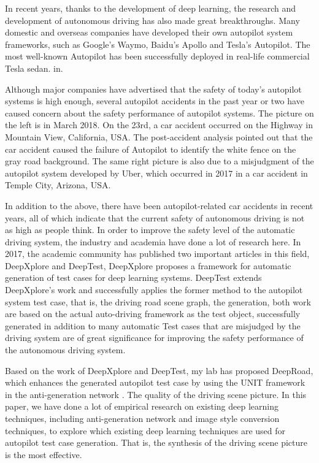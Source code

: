\begin{eabstract}
  In recent years, thanks to the development of deep learning, the research and development of autonomous driving has also made great breakthroughs. Many domestic and overseas companies have developed their own autopilot system frameworks, such as Google's Waymo, Baidu's Apollo and Tesla's Autopilot. The most well-known Autopilot has been successfully deployed in real-life commercial Tesla sedan. in.

  Although major companies have advertised that the safety of today's autopilot systems is high enough, several autopilot accidents in the past year or two have caused concern about the safety performance of autopilot systems. The picture on the left is in March 2018. On the 23rd, a car accident occurred on the Highway in Mountain View, California, USA. The post-accident analysis pointed out that the car accident caused the failure of Autopilot to identify the white fence on the gray road background. The same right picture is also due to a misjudgment of the autopilot system developed by Uber, which occurred in 2017 in a car accident in Temple City, Arizona, USA.

  In addition to the above, there have been autopilot-related car accidents in recent years, all of which indicate that the current safety of autonomous driving is not as high as people think. In order to improve the safety level of the automatic driving system, the industry and academia have done a lot of research here. In 2017, the academic community has published two important articles in this field, DeepXplore\cite{DeepXplore} and DeepTest\cite{ DeepTest}, DeepXplore proposes a framework for automatic generation of test cases for deep learning systems. DeepTest extends DeepXplore's work and successfully applies the former method to the autopilot system test case, that is, the driving road scene graph, the generation, both work are based on the actual auto-driving framework as the test object, successfully generated in addition to many automatic Test cases that are misjudged by the driving system are of great significance for improving the safety performance of the autonomous driving system.

  Based on the work of DeepXplore and DeepTest, my lab has proposed DeepRoad\cite{DeepRoad}, which enhances the generated autopilot test case by using the UNIT\cite{UNIT} framework in the anti-generation network \cite{GAN}. The quality of the driving scene picture. In this paper, we have done a lot of empirical research on existing deep learning techniques, including anti-generation network and image style conversion techniques, to explore which existing deep learning techniques are used for autopilot test case generation. That is, the synthesis of the driving scene picture is the most effective.


\end{eabstract}
